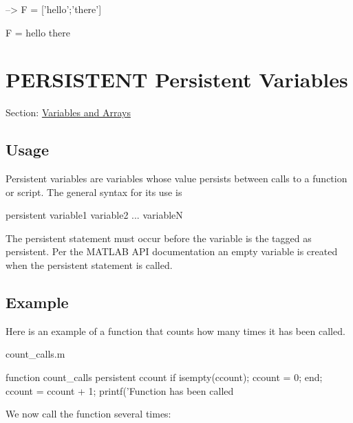 \begin{DoxyVerbInclude}
--> F = ['hello';'there']

F = 
hello
there
\end{DoxyVerbInclude}
 \hypertarget{variables_persistent}{}\section{P\-E\-R\-S\-I\-S\-T\-E\-N\-T Persistent Variables}\label{variables_persistent}
Section\-: \hyperlink{sec_variables}{Variables and Arrays} \hypertarget{vtkwidgets_vtkxyplotwidget_Usage}{}\subsection{Usage}\label{vtkwidgets_vtkxyplotwidget_Usage}
Persistent variables are variables whose value persists between calls to a function or script. The general syntax for its use is \begin{DoxyVerb}   persistent variable1 variable2 ... variableN
\end{DoxyVerb}
 The {\ttfamily persistent} statement must occur before the variable is the tagged as persistent. Per the M\-A\-T\-L\-A\-B A\-P\-I documentation an empty variable is created when the {\ttfamily persistent} statement is called. \hypertarget{variables_struct_Example}{}\subsection{Example}\label{variables_struct_Example}
Here is an example of a function that counts how many times it has been called.

\begin{DoxyVerb}     count_calls.m
\end{DoxyVerb}



\begin{DoxyVerbInclude}
function count_calls
  persistent ccount
  if isempty(ccount); ccount = 0; end;
  ccount = ccount + 1;
  printf('Function has been called %
\end{DoxyVerbInclude}


We now call the function several times\-:


